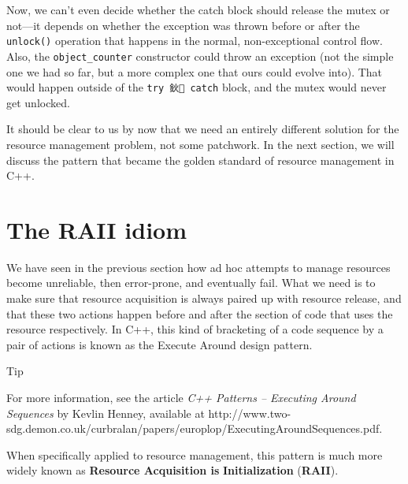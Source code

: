 
Now, we can't even decide whether the catch block should release the mutex or not---it depends on whether the exception was thrown before or after the \texttt{unlock()} operation that happens in the normal, non-exceptional control flow. Also, the \texttt{object\_counter} constructor could throw an exception (not the simple one we had so far, but a more complex one that ours could evolve into). That would happen outside of the \texttt{try\ 鈥 catch} block, and the mutex would never get unlocked.

It should be clear to us by now that we need an entirely different solution for the resource management problem, not some patchwork. In the next section, we will discuss the pattern that became the golden standard of resource management in C++.

\section{The RAII idiom}

We have seen in the previous section how ad hoc attempts to manage resources become unreliable, then error-prone, and eventually fail. What we need is to make sure that resource acquisition is always paired up with resource release, and that these two actions happen before and after the section of code that uses the resource respectively. In C++, this kind of bracketing of a code sequence by a pair of actions is known as the Execute Around design pattern.

Tip

For more information, see the article \emph{C++ Patterns -- Executing Around Sequences} by Kevlin Henney, available at http://www.two-sdg.demon.co.uk/curbralan/papers/europlop/ExecutingAroundSequences.pdf.

When specifically applied to resource management, this pattern is much more widely known as \textbf{Resource Acquisition is} \textbf{Initialization} (\textbf{RAII}).

